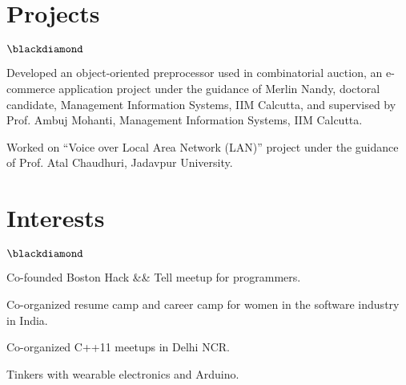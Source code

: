 \documentclass[margin,line]{res}
\newenvironment{list2}{
  \begin{list}{$\blackdiamond$}{%
      \setlength{\itemsep}{0in}
      \setlength{\parsep}{0in} \setlength{\parskip}{0in}
      \setlength{\topsep}{0in} \setlength{\partopsep}{0in}
      \setlength{\leftmargin}{0.2in}}}{\end{list}}
\begin{document}
\begin{resume}
\section{\sc Projects}
\begin{list2} %
\item Developed an object-oriented preprocessor used in combinatorial auction, an e-commerce application project under the guidance of Merlin Nandy, doctoral candidate, Management Information Systems, IIM Calcutta, and supervised by Prof. Ambuj Mohanti, Management Information Systems, IIM Calcutta.
\item Worked on “Voice over Local Area Network (LAN)” project under the guidance of Prof. Atal Chaudhuri, Jadavpur University.
\end{list2}
\section{\sc Interests}
\begin{list2} %
\item Co-founded Boston Hack \&\& Tell meetup for programmers.
\item Co-organized resume camp and career camp for women in the software industry in India.
\item Co-organized C++11 meetups in Delhi NCR.
\item Tinkers with wearable electronics and Arduino.
\end{list2}

\end{resume}
\end{document}
